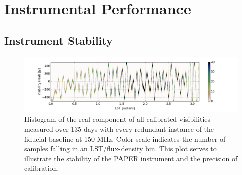 \documentclass[twocolumn,numberedappendix]{emulateapj} \shorttitle{PSA64}
\begin{document}

\section{Instrumental Performance}\label{sec:instrument}
\subsection{Instrument Stability}

\begin{figure}
\centering
\includegraphics[width=2.3\columnwidth]{plots/density.png}
\caption{Histogram of the real component of all calibrated visibilities
measured over 135 days with every redundant instance of the fiducial baseline at 150
MHz.  Color scale indicates the number of samples falling in an
LST/flux-density bin.  This plot serves to illustrate the stability of the
PAPER instrument and the precision of calibration.
}\label{fig:density}
\end{figure}
\end{document}
